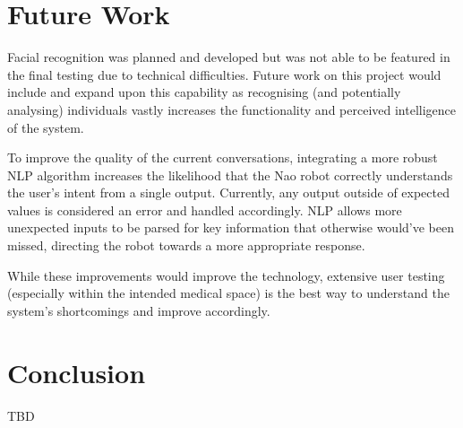 \documentclass[conference]{IEEEtran}
\begin{document}
\section{Future Work}Facial recognition was planned and developed but was not able to be featured in the final testing due to 
technical difficulties. Future work on this project would include and expand upon this capability as recognising (and potentially 
analysing) individuals vastly increases the functionality and perceived intelligence of the system.

To improve the quality of the current conversations, integrating a more robust NLP algorithm increases the likelihood that the Nao 
robot correctly understands the user’s intent from a single output. Currently, any output outside of expected values is considered 
an error and handled accordingly. NLP allows more unexpected inputs to be parsed for key information that otherwise would’ve been 
missed, directing the robot towards a more appropriate response.

While these improvements would improve the technology, extensive user testing (especially within the intended medical space) is the 
best way to understand the system's shortcomings and improve accordingly.


\section{Conclusion}

TBD



\end{document}
